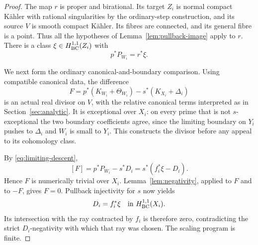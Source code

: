 \begin{proof}
The map $r$ is proper and birational.  Its target $Z_i$ is normal
compact Kähler with rational singularities by the ordinary-step
construction, and its source $V$ is smooth compact Kähler.
Its fibres are connected, and its general fibre is a point.
Thus all the hypotheses of Lemma~\ref{lem:pullback-image} apply to
$r$.  There is a class $\xi\in H^{1,1}_{\mathrm{BC}}(Z_i)$ with
\begin{equation}
 p^*P_{W_i}=r^*\xi.
 \label{eq:limiting-descent}
\end{equation}

We next form the ordinary canonical-and-boundary comparison.
Using compatible canonical data, the difference
\begin{equation}
 F=p^*(K_{W_i}+\Theta_{W_i})
          -s^*(K_{X_i}+\Delta_i)
 \label{eq:final-exceptional-divisor}
\end{equation}
is an actual real divisor on $V$, with the relative canonical terms
interpreted as in Section~\ref{sec:analytic}.
It is exceptional over $X_i$: on every prime that is not
$s$-exceptional the two boundary coefficients agree, since the
limiting boundary on $Y_i$ pushes to $\Delta_i$ and $W_i$ is small
to $Y_i$.  This constructs the divisor before any appeal to its
cohomology class.

By \eqref{eq:limiting-descent},
\[
 [F]=p^*P_{W_i}-s^*D_i
     =s^*(f_i^*\xi-D_i).
\]
Hence $F$ is numerically trivial over $X_i$.
Lemma~\ref{lem:negativity}, applied to $F$ and to $-F$, gives $F=0$.
Pullback injectivity for $s$ now yields
\[
 D_i=f_i^*\xi\quad\text{in }H^{1,1}_{\mathrm{BC}}(X_i).
\]
Its intersection with the ray contracted by $f_i$ is therefore zero,
contradicting the strict $D_i$-negativity with which that ray was chosen.
The scaling program is finite.
\end{proof}
